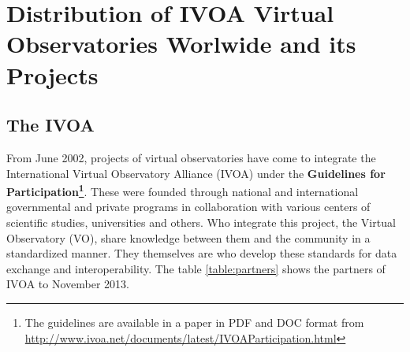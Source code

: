 \section{Distribution of IVOA Virtual Observatories Worlwide and its Projects}
\subsection{The IVOA}
From June 2002, projects of virtual observatories have come to integrate the
International Virtual Observatory Alliance (IVOA) under the \textbf{Guidelines
for Participation\footnote{The guidelines are available in a paper in PDF and
DOC format from
\url{http://www.ivoa.net/documents/latest/IVOAParticipation.html}}}. These were
founded through national and international governmental and private programs in
collaboration with various centers of scientific studies, universities and
others. Who integrate this project, the Virtual Observatory (VO), share
knowledge between them and the community in a standardized manner. They
themselves are who develop these standards for data exchange and
interoperability. The table \ref{table:partners} shows the partners of IVOA to
November 2013.\\

